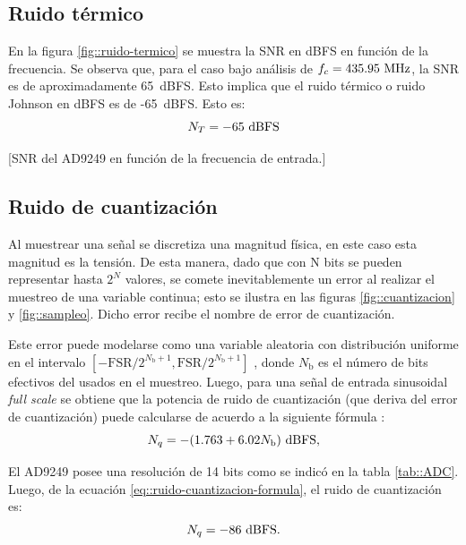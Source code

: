 \documentclass[../../main.tex]{subfiles}
\begin{document}
\subsection{Ruido térmico}
En la figura \ref{fig::ruido-termico} se muestra la SNR en dBFS en función de la frecuencia. Se observa que, para el caso bajo análisis de $f_c = 435.95~\textrm{MHz}$, la SNR es de aproximadamente 65~dBFS. Esto implica que el ruido térmico o ruido Johnson en dBFS es de -65~dBFS. Esto es:
\begin{equation}
    N_T = -65~\textrm{dBFS}
    \label{eq::ruido-termico}
\end{equation}

[SNR del AD9249 en función de la frecuencia de entrada.]

\subsection{Ruido de cuantización}
Al muestrear una señal se discretiza una magnitud física, en este caso esta magnitud es la tensión. De esta manera, dado que con N bits se pueden representar hasta $2^N$ valores, se comete inevitablemente un error al realizar el muestreo de una variable continua; esto se ilustra en las figuras \ref{fig::cuantizacion} y \ref{fig::sampleo}. Dicho error recibe el nombre de error de cuantización.

Este error puede modelarse como una variable aleatoria con distribución uniforme en el intervalo $[-\textrm{FSR}/{2^{N_\textrm{b} + 1}}, \textrm{FSR}/{2^{N_\textrm{b} + 1}}]$ \cite{formula-cuantizacion}, donde $N_\textrm{b}$ es el número de bits efectivos del usados en el muestreo. Luego, para una señal de entrada sinusoidal \textit{full scale} se obtiene que la potencia de ruido de cuantización (que deriva del error de cuantización) puede calcularse de acuerdo a la siguiente fórmula \cite{formula-cuantizacion}:
\begin{equation}
    N_q = - (1.763 + 6.02 N_\textrm{b})~\textrm{dBFS},
    \label{eq::ruido-cuantizacion-formula}
\end{equation}

El AD9249 posee una resolución de 14 bits como se indicó en la tabla \ref{tab::ADC}. Luego, de la ecuación \ref{eq::ruido-cuantizacion-formula}, el ruido de cuantización es:
\begin{equation}
    N_q = -86~\textrm{dBFS}.
    \label{eq::ruido-cuantizacion}
\end{equation}
\end{document}
